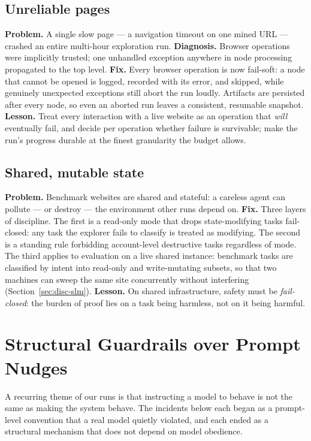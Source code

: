 \subsection{Unreliable pages}

\textbf{Problem.} A single slow page --- a navigation timeout on one mined
URL --- crashed an entire multi-hour exploration run.
\textbf{Diagnosis.} Browser operations were implicitly trusted; one
unhandled exception anywhere in node processing propagated to the top level.
\textbf{Fix.} Every browser operation is now fail-soft: a node that cannot be
opened is logged, recorded with its error, and skipped, while genuinely
unexpected exceptions still abort the run loudly. Artifacts are persisted
after every node, so even an aborted run leaves a consistent, resumable
snapshot.
\textbf{Lesson.} Treat every interaction with a live website as an
operation that \emph{will} eventually fail, and decide per operation whether
failure is survivable; make the run's progress durable at the finest
granularity the budget allows.

\subsection{Shared, mutable state}

\textbf{Problem.} Benchmark websites are shared and stateful: a careless
agent can pollute --- or destroy --- the environment other runs depend on.
\textbf{Fix.} Three layers of discipline. The first is a read-only mode that
drops state-modifying tasks fail-closed: any task the explorer fails to
classify is treated as modifying. The second is a standing rule forbidding
account-level destructive tasks regardless of mode. The third applies to
evaluation on a live shared instance: benchmark tasks are classified by
intent into read-only and write-mutating subsets, so that two machines can
sweep the same site concurrently without interfering
(Section~\ref{sec:disc-slm}).
\textbf{Lesson.} On shared infrastructure, safety must be
\emph{fail-closed}: the burden of proof lies on a task being harmless, not on
it being harmful.

\section{Structural Guardrails over Prompt Nudges}
\label{sec:disc-guardrails}

A recurring theme of our runs is that instructing a model to behave is not
the same as making the system behave. The incidents below each began as a
prompt-level convention that a real model quietly violated, and each ended as
a structural mechanism that does not depend on model obedience.


